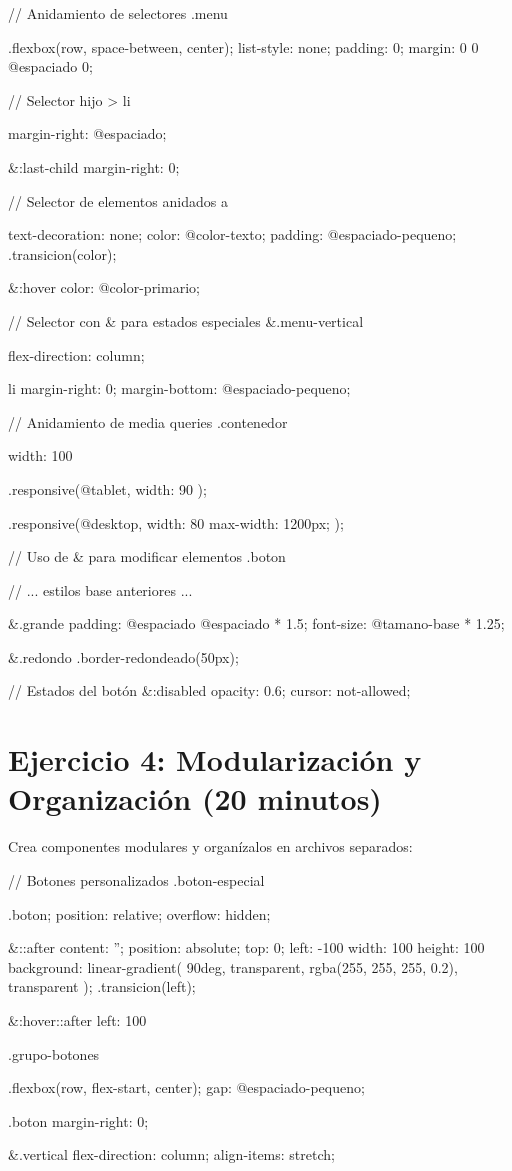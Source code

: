 \documentclass[12pt, a4paper]{article}
\newcommand{\ejercicio}[2]{
    \section*{Ejercicio #1: #2}
    \vspace{0.3em}
}
\begin{document}
\begin{codebox}[title=styles/main.less (continuación)]
// Anidamiento de selectores
.menu {
  .flexbox(row, space-between, center);
  list-style: none;
  padding: 0;
  margin: 0 0 @espaciado 0;
  
  // Selector hijo
  > li {
    margin-right: @espaciado;
    
    &:last-child {
      margin-right: 0;
    }
  }
  
  // Selector de elementos anidados
  a {
    text-decoration: none;
    color: @color-texto;
    padding: @espaciado-pequeno;
    .transicion(color);
    
    &:hover {
      color: @color-primario;
    }
  }
  
  // Selector con & para estados especiales
  &.menu-vertical {
    flex-direction: column;
    
    li {
      margin-right: 0;
      margin-bottom: @espaciado-pequeno;
    }
  }
}

// Anidamiento de media queries
.contenedor {
  width: 100%
  
  .responsive(@tablet, {
    width: 90%
  });
  
  .responsive(@desktop, {
    width: 80%
    max-width: 1200px;
  });
}

// Uso de & para modificar elementos
.boton {
  // ... estilos base anteriores ...
  
  &.grande {
    padding: @espaciado @espaciado * 1.5;
    font-size: @tamano-base * 1.25;
  }
  
  &.redondo {
    .border-redondeado(50px);
  }
  
  // Estados del botón
  &:disabled {
    opacity: 0.6;
    cursor: not-allowed;
  }
}
\end{codebox}

\ejercicio{4}{Modularización y Organización (20 minutos)}

Crea componentes modulares y organízalos en archivos separados:

\begin{codebox}[title=styles/componentes/botones.less]
// Botones personalizados
.boton-especial {
  .boton;
  position: relative;
  overflow: hidden;
  
  &::after {
    content: '';
    position: absolute;
    top: 0;
    left: -100%
    width: 100%
    height: 100%
    background: linear-gradient(
      90deg,
      transparent,
      rgba(255, 255, 255, 0.2),
      transparent
    );
    .transicion(left);
  }
  
  &:hover::after {
    left: 100%
  }
}

.grupo-botones {
  .flexbox(row, flex-start, center);
  gap: @espaciado-pequeno;
  
  .boton {
    margin-right: 0;
  }
  
  &.vertical {
    flex-direction: column;
    align-items: stretch;
  }
}
\end{codebox}
\end{document}
